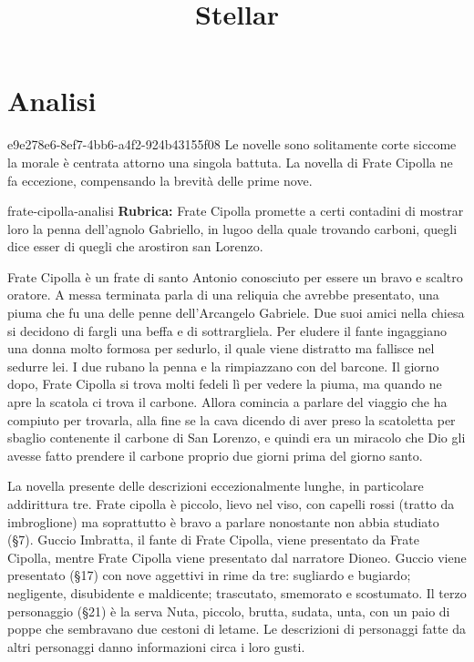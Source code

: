 \documentclass[preview]{standalone}
\begin{document}
\title{Stellar}
\genpage

\section{Analisi}

\begin{snippetnote}{e9e278e6-8ef7-4bb6-a4f2-924b43155f08}{}
    Le novelle sono solitamente corte siccome la morale è centrata attorno una singola battuta.
    La novella di Frate Cipolla ne fa eccezione, compensando la brevità delle prime nove.
\end{snippetnote}

\begin{snippet}{frate-cipolla-analisi}
    \textbf{Rubrica:} Frate Cipolla promette a certi contadini di mostrar loro la penna dell'agnolo Gabriello, in lugoo della quale trovando carboni, quegli dice esser di quegli che arostiron san Lorenzo.

    Frate Cipolla è un frate di santo Antonio conosciuto per essere un bravo e scaltro oratore.
    A messa terminata parla di una reliquia che avrebbe presentato, una piuma che fu una delle penne dell'Arcangelo Gabriele.
    Due suoi amici nella chiesa si decidono di fargli una beffa e di sottrargliela.
    Per eludere il fante ingaggiano una donna molto formosa per sedurlo, il quale viene distratto ma fallisce nel sedurre lei.
    I due rubano la penna e la rimpiazzano con del barcone.
    Il giorno dopo, Frate Cipolla si trova molti fedeli lì per vedere la piuma, ma quando ne apre la scatola
    ci trova il carbone. Allora comincia a parlare del viaggio che ha compiuto per trovarla,
    alla fine se la cava dicendo di aver preso la scatoletta per sbaglio contenente il carbone di San Lorenzo,
    e quindi era un miracolo che Dio gli avesse fatto prendere il carbone proprio due giorni prima del giorno santo.
    
    
    La novella presente delle descrizioni eccezionalmente lunghe, in particolare addirittura tre.
    Frate cipolla è piccolo, lievo nel viso, con capelli rossi (tratto da imbroglione) ma
    soprattutto è bravo a parlare nonostante non abbia studiato (§7).
    Guccio Imbratta, il fante di Frate Cipolla, viene presentato da Frate Cipolla,
    mentre Frate Cipolla viene presentato dal narratore Dioneo.
    Guccio viene presentato (§17) con nove aggettivi in rime da tre:
    sugliardo e bugiardo; negligente, disubidente e maldicente; trascutato, smemorato e scostumato.
    Il terzo personaggio (§21) è la serva Nuta, piccolo, brutta, sudata, unta, con un paio di poppe che sembravano due
    cestoni di letame.
    Le descrizioni di personaggi fatte da altri personaggi danno informazioni circa i loro gusti.
    

\end{snippet}
\end{document}
